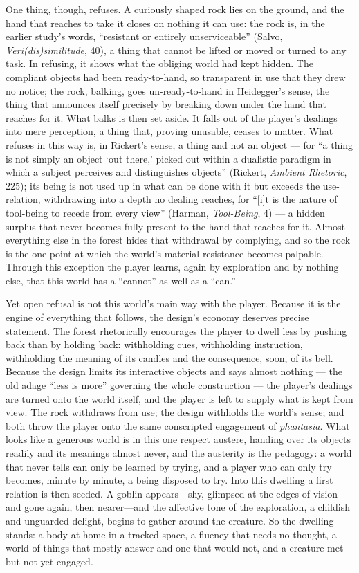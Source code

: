 \documentclass{article}
\begin{document}
One thing, though, refuses. A curiously shaped rock lies on the ground, and the hand that reaches to take it closes on nothing it can use: the rock is, in the earlier study's words, ``resistant or entirely unserviceable'' (Salvo, \textit{Veri(dis)similitude}, 40), a thing that cannot be lifted or moved or turned to any task. In refusing, it shows what the obliging world had kept hidden. The compliant objects had been ready-to-hand, so transparent in use that they drew no notice; the rock, balking, goes un-ready-to-hand in Heidegger's sense, the thing that announces itself precisely by breaking down under the hand that reaches for it. What balks is then set aside. It falls out of the player's dealings into mere perception, a thing that, proving unusable, ceases to matter. What refuses in this way is, in Rickert's sense, a thing and not an object — for ``a thing is not simply an object `out there,' picked out within a dualistic paradigm in which a subject perceives and distinguishes objects'' (Rickert, \textit{Ambient Rhetoric}, 225); its being is not used up in what can be done with it but exceeds the use-relation, withdrawing into a depth no dealing reaches, for ``[i]t is the nature of tool-being to recede from every view'' (Harman, \textit{Tool-Being}, 4) — a hidden surplus that never becomes fully present to the hand that reaches for it. Almost everything else in the forest hides that withdrawal by complying, and so the rock is the one point at which the world's material resistance becomes palpable. Through this exception the player learns, again by exploration and by nothing else, that this world has a ``cannot'' as well as a ``can.''

Yet open refusal is not this world's main way with the player. Because it is the engine of everything that follows, the design's economy deserves precise statement. The forest rhetorically encourages the player to dwell less by pushing back than by holding back: withholding cues, withholding instruction, withholding the meaning of its candles and the consequence, soon, of its bell. Because the design limits its interactive objects and says almost nothing — the old adage ``less is more'' governing the whole construction — the player's dealings are turned onto the world itself, and the player is left to supply what is kept from view. The rock withdraws from use; the design withholds the world's sense; and both throw the player onto the same conscripted engagement of \textit{phantasia}. What looks like a generous world is in this one respect austere, handing over its objects readily and its meanings almost never, and the austerity is the pedagogy: a world that never tells can only be learned by trying, and a player who can only try becomes, minute by minute, a being disposed to try. Into this dwelling a first relation is then seeded. A goblin appears---shy, glimpsed at the edges of vision and gone again, then nearer---and the affective tone of the exploration, a childish and unguarded delight, begins to gather around the creature. So the dwelling stands: a body at home in a tracked space, a fluency that needs no thought, a world of things that mostly answer and one that would not, and a creature met but not yet engaged.
\end{document}
